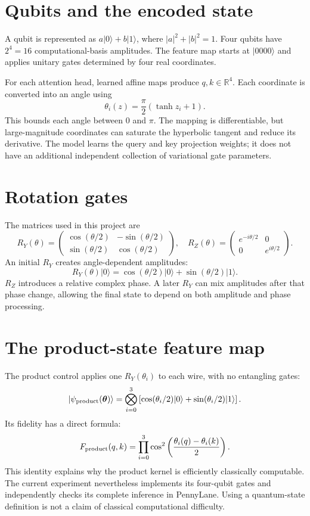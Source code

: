 \documentclass[11pt,a4paper]{report}
\newcommand{\ket}[1]{\lvert #1\rangle}
\begin{document}
\section{Qubits and the encoded state}
A qubit is represented as $a\ket0+b\ket1$, where $|a|^2+|b|^2=1$. Four qubits have $2^4=16$ computational-basis amplitudes. The feature map starts at $\ket{0000}$ and applies unitary gates determined by four real coordinates.

For each attention head, learned affine maps produce $q,k\in\mathbb R^4$. Each coordinate is converted into an angle using
\begin{equation}
\theta_i(z)=\frac\pi2(\tanh z_i+1).
\end{equation}
This bounds each angle between 0 and $\pi$. The mapping is differentiable, but large-magnitude coordinates can saturate the hyperbolic tangent and reduce its derivative. The model learns the query and key projection weights; it does not have an additional independent collection of variational gate parameters.

\section{Rotation gates}
The matrices used in this project are
\begin{equation}
R_Y(\theta)=\begin{pmatrix}\cos(\theta/2)&-\sin(\theta/2)\\\sin(\theta/2)&\cos(\theta/2)\end{pmatrix},
\quad
R_Z(\theta)=\begin{pmatrix}e^{-i\theta/2}&0\\0&e^{i\theta/2}\end{pmatrix}.
\end{equation}
An initial $R_Y$ creates angle-dependent amplitudes:
\begin{equation}
R_Y(\theta)\ket0=\cos(\theta/2)\ket0+\sin(\theta/2)\ket1.
\end{equation}
$R_Z$ introduces a relative complex phase. A later $R_Y$ can mix amplitudes after that phase change, allowing the final state to depend on both amplitude and phase processing.

\section{The product-state feature map}
The product control applies one $R_Y(\theta_i)$ to each wire, with no entangling gates:
\begin{equation}
\ket{\psi_{\rm product}(\boldsymbol\theta)}=
\bigotimes_{i=0}^{3}\left[\cos(\theta_i/2)\ket0+\sin(\theta_i/2)\ket1\right].
\end{equation}
Its fidelity has a direct formula:
\begin{equation}
F_{\rm product}(q,k)=\prod_{i=0}^{3}
\cos^2\left(\frac{\theta_i(q)-\theta_i(k)}2\right).
\end{equation}
This identity explains why the product kernel is efficiently classically computable. The current experiment nevertheless implements its four-qubit gates and independently checks its complete inference in PennyLane. Using a quantum-state definition is not a claim of classical computational difficulty.
\end{document}
